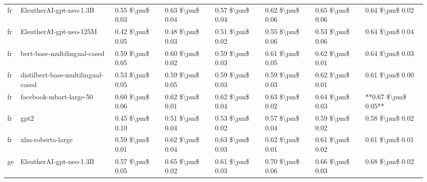 \begin{tabular}{llllllll}
      fr &            EleutherAI-gpt-neo-1.3B & 0.55 \$\textbackslash pm\$ 0.03 &           0.63 \$\textbackslash pm\$ 0.04 &       0.57 \$\textbackslash pm\$ 0.04 &        0.62 \$\textbackslash pm\$ 0.06 &                         0.65 \$\textbackslash pm\$ 0.06 &     0.64 \$\textbackslash pm\$ 0.02 \\
      fr &            EleutherAI-gpt-neo-125M & 0.42 \$\textbackslash pm\$ 0.05 &           0.48 \$\textbackslash pm\$ 0.03 &       0.51 \$\textbackslash pm\$ 0.02 &        0.55 \$\textbackslash pm\$ 0.06 &                         0.53 \$\textbackslash pm\$ 0.06 &     0.64 \$\textbackslash pm\$ 0.04 \\
      fr &       bert-base-multilingual-cased & 0.59 \$\textbackslash pm\$ 0.05 &           0.60 \$\textbackslash pm\$ 0.02 &       0.59 \$\textbackslash pm\$ 0.03 &        0.61 \$\textbackslash pm\$ 0.05 &                         0.62 \$\textbackslash pm\$ 0.01 &     0.64 \$\textbackslash pm\$ 0.03 \\
      fr & distilbert-base-multilingual-cased & 0.53 \$\textbackslash pm\$ 0.05 &           0.59 \$\textbackslash pm\$ 0.05 &       0.59 \$\textbackslash pm\$ 0.03 &        0.59 \$\textbackslash pm\$ 0.03 &                         0.62 \$\textbackslash pm\$ 0.01 &     0.61 \$\textbackslash pm\$ 0.00 \\
      fr &            facebook-mbart-large-50 & 0.60 \$\textbackslash pm\$ 0.06 &           0.62 \$\textbackslash pm\$ 0.01 &       0.62 \$\textbackslash pm\$ 0.04 &        0.63 \$\textbackslash pm\$ 0.02 &                         0.64 \$\textbackslash pm\$ 0.03 & **0.67 \$\textbackslash pm\$ 0.05** \\
      fr &                               gpt2 & 0.45 \$\textbackslash pm\$ 0.10 &           0.51 \$\textbackslash pm\$ 0.04 &       0.53 \$\textbackslash pm\$ 0.02 &        0.57 \$\textbackslash pm\$ 0.04 &                         0.59 \$\textbackslash pm\$ 0.02 &     0.58 \$\textbackslash pm\$ 0.02 \\
      fr &                  xlm-roberta-large & 0.59 \$\textbackslash pm\$ 0.01 &           0.62 \$\textbackslash pm\$ 0.04 &       0.63 \$\textbackslash pm\$ 0.03 &        0.62 \$\textbackslash pm\$ 0.01 &                         0.61 \$\textbackslash pm\$ 0.02 &     0.61 \$\textbackslash pm\$ 0.01 \\
      ge &            EleutherAI-gpt-neo-1.3B & 0.57 \$\textbackslash pm\$ 0.05 &           0.65 \$\textbackslash pm\$ 0.02 &       0.61 \$\textbackslash pm\$ 0.03 &        0.70 \$\textbackslash pm\$ 0.06 &                         0.66 \$\textbackslash pm\$ 0.03 &     0.68 \$\textbackslash pm\$ 0.02 \\

\end{tabular}
